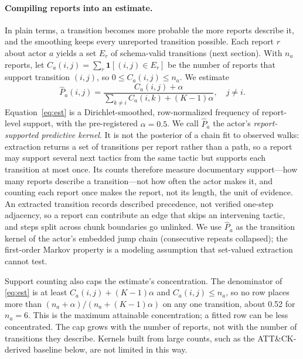 \documentclass[letterpaper]{article}
\begin{document}
\paragraph{Compiling reports into an estimate.} In plain terms, a transition becomes more probable the more reports describe it, and the smoothing keeps every unreported transition possible. Each report $r$ about actor $a$ yields a set $E_r$ of schema-valid transitions (next section). With $n_a$ reports, let $C_a(i,j)=\sum_r \mathbf{1}[(i,j)\in E_r]$ be the number of reports that support transition $(i,j)$, so $0\le C_a(i,j)\le n_a$. We estimate
\begin{equation}
\hat P_a(i,j)=\frac{C_a(i,j)+\alpha}{\sum_{k\neq i}C_a(i,k)+(K-1)\alpha},\quad j\neq i.
\label{eq:est}
\end{equation}
Equation~\eqref{eq:est} is a Dirichlet-smoothed, row-normalized frequency of report-level support, with the pre-registered $\alpha = 0.5$. We call $\hat{P}_a$ the actor's \emph{report-supported predictive kernel}. It is not the posterior of a chain fit to observed walks: extraction returns a set of transitions per report rather than a path, so a report may support several next tactics from the same tactic but supports each transition at most once. Its counts therefore measure documentary support---how many reports describe a transition---not how often the actor makes it, and counting each report once makes the report, not its length, the unit of evidence. An extracted transition records described precedence, not verified one-step adjacency, so a report can contribute an edge that skips an intervening tactic, and steps split across chunk boundaries go unlinked. We use $\hat{P}_a$ as the transition kernel of the actor's embedded jump chain (consecutive repeats collapsed); the first-order Markov property is a modeling assumption that set-valued extraction cannot test.

Support counting also caps the estimate's concentration. The denominator of \eqref{eq:est} is at least $C_a(i,j)+(K-1)\alpha$ and $C_a(i,j)\le n_a$, so no row places more than $(n_a+\alpha)/(n_a+(K-1)\alpha)$ on any one transition, about 0.52 for $n_a=6$. This is the maximum attainable concentration; a fitted row can be less concentrated. The cap grows with the number of reports, not with the number of transitions they describe. Kernels built from large counts, such as the ATT\&CK-derived baseline below, are not limited in this way.
\end{document}
